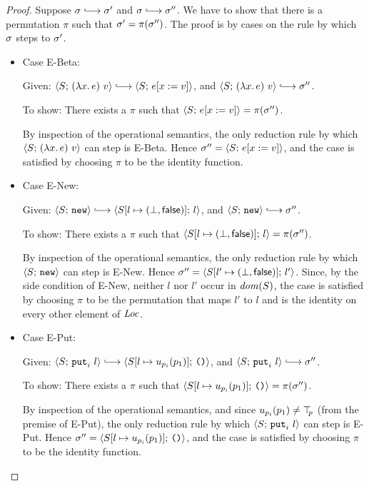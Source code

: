 \begin{proof}
  Suppose $\conf \parstepsto \conf'$ and $\conf \parstepsto \conf''$.
  We have to show that there is a permutation $\pi$ such that $\sigma'
  = \pi(\sigma'')$.  The proof is by cases on the rule by which $\sigma$
  steps to $\sigma'$.

  \begin{itemize}

  \item Case {\sc E-Beta}:

    Given: $\config{S}{\app{(\lam{x}{e})}{v}} \parstepsto
    \config{S}{\subst{e}{x}{v}}$, and
    $\config{S}{\app{(\lam{x}{e})}{v}} \parstepsto \conf''$.

    To show: There exists a $\pi$ such that
    $\langle S;\, e[x := v] \rangle = \pi(\sigma'')$.

    By inspection of the operational semantics, the only reduction
    rule by which $\langle S;\, (\lambda x.\,e)~v \rangle$ can step is
    {\sc E-Beta}.  Hence $\sigma'' = \langle S;\, e[x := v] \rangle$,
    and the case is satisfied by choosing $\pi$ to be the identity
    function.

  \item Case {\sc E-New}:

    Given: $\config{S}{\NEW} \parstepsto
    \config{\extS{S}{l}{\bot}{\frozenfalse}}{l}$, and
    $\config{S}{\NEW} \parstepsto \conf''$.

    To show: There exists a $\pi$ such that
    $\langle S[l \mapsto (\bot, \textsf{false})];\, l \rangle = \pi(\sigma'')$.

    By inspection of the operational semantics, the only reduction
    rule by which $\langle S;\, \mbox{\texttt{new}} \rangle$ can step is {\sc E-New}.  Hence
    $\sigma'' = \langle S[l' \mapsto (\bot, \textsf{false})];\, l' \rangle$.  Since,
    by the side condition of {\sc E-New}, neither $l$ nor $l'$ occur
    in $\mathit{dom}(S)$, the case is satisfied by choosing $\pi$ to be the
    permutation that maps $l'$ to $l$ and is the identity on every
    other element of $\mathit{Loc}$.

  \item Case {\sc E-Put}:

    Given: $\config{S}{\putiexp{l}} \parstepsto
    \config{\extSRaw{S}{l}{u_{p_i}(p_1)}}{\unit}$, and
    $\config{S}{\putiexp{l}} \parstepsto \conf''$.

    To show: There exists a $\pi$ such that
    $\langle S[l \mapsto u_{p_i}(p_1)];\, \mbox{\texttt{()}} \rangle = \pi(\sigma'')$.

    By inspection of the operational semantics, and since
    $u_{p_i}(p_1) \neq \top\hspace{-0.85mm}_{p}$ (from the premise of {\sc E-Put}), the
    only reduction rule by which $\langle S;\, \mbox{\texttt{put}}_i~l \rangle$ can step is
    {\sc E-Put}.  Hence $\sigma'' =
    \langle S[l \mapsto u_{p_i}(p_1)];\, \mbox{\texttt{()}} \rangle$, and the case is
    satisfied by choosing $\pi$ to be the identity function.


\end{itemize}
\end{proof}
